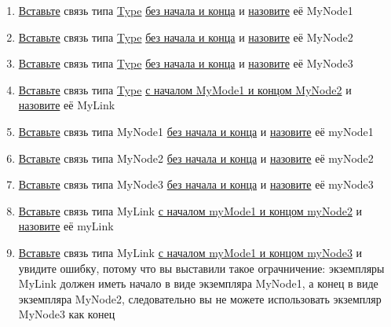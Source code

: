 \begin{enumerate}
      \item \hyperlink{DeepCase.InsertLink.Description}{Вставьте} связь типа
            \hyperlink{Core.Type.Description}{Type}
            \hyperlink{FAQ.HowToInsertLinkWithoutFromAndTo}{без
                  начала и конца} и \hyperlink{FAQ.HowToSetName}{назовите} её
            MyNode1
      \item \hyperlink{DeepCase.InsertLink.Description}{Вставьте} связь типа
            \hyperlink{Core.Type.Description}{Type}
            \hyperlink{FAQ.HowToInsertLinkWithoutFromAndTo}{без
                  начала и конца} и \hyperlink{FAQ.HowToSetName}{назовите} её
            MyNode2
      \item \hyperlink{DeepCase.InsertLink.Description}{Вставьте} связь типа
            \hyperlink{Core.Type.Description}{Type}
            \hyperlink{FAQ.HowToInsertLinkWithoutFromAndTo}{без
                  начала и конца} и \hyperlink{FAQ.HowToSetName}{назовите} её
            MyNode3
      \item \hyperlink{DeepCase.InsertLink.Description}{Вставьте} связь типа
            \hyperlink{Core.Type.Description}{Type}
            \hyperlink{FAQ.HowToInsertLinkWithFromAndTo}{с
                  началом MyMode1 и концом MyNode2} и
            \hyperlink{FAQ.HowToSetName}{назовите} её
            MyLink
      \item \hyperlink{DeepCase.InsertLink.Description}{Вставьте} связь типа
            MyNode1
            \hyperlink{FAQ.HowToInsertLinkWithoutFromAndTo}{без начала и конца}
            и
            \hyperlink{FAQ.HowToSetName}{назовите} её myNode1
      \item \hyperlink{DeepCase.InsertLink.Description}{Вставьте} связь типа
            MyNode2
            \hyperlink{FAQ.HowToInsertLinkWithoutFromAndTo}{без начала и конца}
            и
            \hyperlink{FAQ.HowToSetName}{назовите} её myNode2
      \item \hyperlink{DeepCase.InsertLink.Description}{Вставьте} связь типа
            MyNode3
            \hyperlink{FAQ.HowToInsertLinkWithoutFromAndTo}{без начала и конца}
            и
            \hyperlink{FAQ.HowToSetName}{назовите} её myNode3
      \item \hyperlink{DeepCase.InsertLink.Description}{Вставьте} связь типа
            MyLink
            \hyperlink{FAQ.HowToInsertLinkWithFromAndTo}{с началом myMode1 и
                  концом
                  myNode2} и \hyperlink{FAQ.HowToSetName}{назовите} её myLink
      \item \hyperlink{DeepCase.InsertLink.Description}{Вставьте} связь типа
            MyLink
            \hyperlink{FAQ.HowToInsertLinkWithFromAndTo}{с началом myMode1 и
                  концом
                  myNode3} и увидите ошибку, потому что вы выставили такое
            ограчничение:
            экземпляры MyLink должен иметь начало в виде экземпляра  MyNode1, а
            конец в
            виде экземпляра MyNode2, следовательно вы не можете использовать
            экземпляр
            MyNode3 как конец
\end{enumerate}

